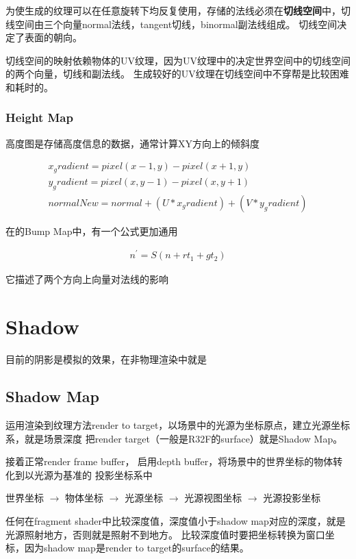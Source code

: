 为使生成的纹理可以在任意旋转下均反复使用，存储的法线必须在\textbf{切线空间}中，切线空间由三个向量normal法线，tangent切线，binormal副法线组成。
切线空间决定了表面的朝向。

切线空间的映射依赖物体的UV纹理，因为UV纹理中的决定世界空间中的切线空间的两个向量，切线和副法线。
生成较好的UV纹理在切线空间中不穿帮是比较困难和耗时的。

\subsection{Height Map}
高度图是存储高度信息的数据，通常计算XY方向上的倾斜度

\begin{gather*}
    x_gradient = pixel(x-1,y) - pixel(x+1,y) \\
    y_gradient = pixel(x,y-1) - pixel(x,y+1) \\
    normalNew = normal + (U * x_gradient) + (V * y_gradient)
\end{gather*}

在的Bump Map\cite{CGPP3ed}中，有一个公式更加通用

\begin{align*}
    n^{'} = S(n + rt_{1} + gt_{2})
\end{align*}

它描述了两个方向上向量对法线的影响


\chapter{Shadow}

目前的阴影是模拟的效果，在非物理渲染中就是

\section{Shadow Map}

运用渲染到纹理方法render to target，以场景中的光源为坐标原点，建立光源坐标系，就是场景深度
把render target（一般是R32F的surface）就是Shadow Map。 

接着正常render frame buffer， 启用depth buffer，将场景中的世界坐标的物体转化到以光源为基准的
投影坐标系中

世界坐标 $\rightarrow$ 物体坐标 $\rightarrow$ 光源坐标 $\rightarrow$ 光源视图坐标 $\rightarrow$ 光源投影坐标

任何在fragment shader中比较深度值，深度值小于shadow map对应的深度，就是光源照射地方，否则就是照射不到地方。
比较深度值时要把坐标转换为窗口坐标，因为shadow map是render to target的surface的结果。

